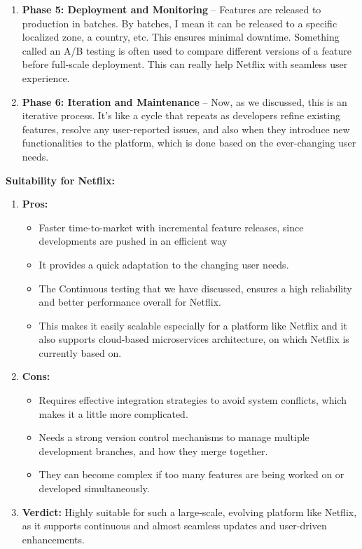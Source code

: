 \documentclass[a4paper,10pt,twoside]{article}
\begin{document}
\begin{enumerate}
    \item \textbf{Phase 5: Deployment and Monitoring} – Features are released to production in batches. By batches, I mean it can be released to a specific localized zone, a country, etc. This ensures minimal downtime. Something called an A/B testing is often used to compare different versions of a feature before full-scale deployment. This can really help Netflix with seamless user experience.
    \item \textbf{Phase 6: Iteration and Maintenance} – Now, as we discussed, this is an iterative process. It’s like a cycle that repeats as developers refine existing features, resolve any user-reported issues, and also when they introduce new functionalities to the platform, which is done based on the ever-changing user needs.
\end{enumerate}
\textbf{Suitability for Netflix:}
\begin{enumerate}
    \item \textbf{Pros:}
    \begin{itemize}
        \item Faster time-to-market with incremental feature releases, since developments are pushed in an efficient way
        \item It provides a quick adaptation to the changing user needs.
        \item The Continuous testing that we have discussed, ensures a high reliability and better performance overall for Netflix.
        \item This makes it easily scalable especially for a platform like Netflix and it also supports cloud-based microservices architecture, on which Netflix is currently based on.
    \end{itemize}
    \item \textbf{Cons:}
    \begin{itemize}
        \item Requires effective integration strategies to avoid system conflicts, which makes it a little more complicated.
        \item Needs a strong version control mechanisms to manage multiple development branches, and how they merge together.
        \item They can become complex if too many features are being worked on or developed simultaneously.
    \end{itemize}
    \item \textbf{Verdict:} Highly suitable for such a large-scale, evolving platform like Netflix, as it supports continuous and almost seamless updates and user-driven enhancements.
\end{enumerate}
\end{document}
